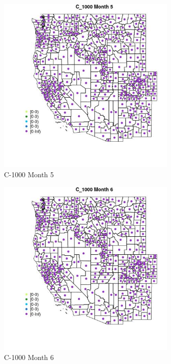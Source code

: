 \begin{figure} 
\centering  
\includegraphics[width=0.77\textwidth]{Code_Outputs/df_report_ML_predictors_CountyCentroid_Locations_Dates_2008-01-01to2018-12-31_MapObsMo5C_1000.jpg} 
\caption{\label{fig:df_report_ML_predictors_CountyCentroid_Locations_Dates_2008-01-01to2018-12-31MapObsMo5C_1000}C-1000 Month 5} 
\end{figure} 
 

\begin{figure} 
\centering  
\includegraphics[width=0.77\textwidth]{Code_Outputs/df_report_ML_predictors_CountyCentroid_Locations_Dates_2008-01-01to2018-12-31_MapObsMo6C_1000.jpg} 
\caption{\label{fig:df_report_ML_predictors_CountyCentroid_Locations_Dates_2008-01-01to2018-12-31MapObsMo6C_1000}C-1000 Month 6} 
\end{figure} 
 

